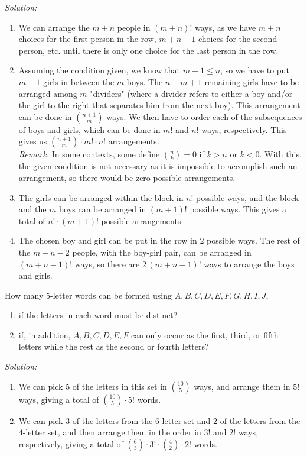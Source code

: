 \documentclass[12pt]{scrartcl}
\newenvironment{problem}[2][Problem]{\begin{trivlist}
\item[\hskip \labelsep {\bfseries #1}\hskip \labelsep {\bfseries #2.}]}{\end{trivlist}}
\newenvironment{sol}
    {\emph{Solution:}
    }
    {
    \qedhere
    }
\begin{document}
\begin{sol}
\begin{enumerate}[label=(\roman*)]
\item We can arrange the $m+n$ people in $\boxed{(m+n)!}$ ways, as we have $m+n$ choices for the first person in the row, $m+n-1$ choices for the second person, etc. until there is only one choice for the last person in the row. 
\item Assuming the condition given, we know that $m - 1 \leq n$, so we have to put $m-1$ girls in between the $m$ boys. The $n - m + 1$ remaining girls have to be arranged among $m$ "dividers" (where a divider refers to either a boy and/or the girl to the right that separates him from the next boy). This arrangement can be done in $\binom{n+1}{m}$ ways. We then have to order each of the subsequences of boys and girls, which can be done in $m!$ and $n!$ ways, respectively. This gives us $\boxed{\binom{n+1}{m} \cdot m! \cdot n!}$ arrangements. \\
\textit{Remark.} In some contexts, some define $\binom{n}{k} = 0$ if $k > n$ or $k < 0$. With this, the given condition is not necessary as it is impossible to accomplish such an arrangement, so there would be zero possible arrangements. 
\item The girls can be arranged within the block in $n!$ possible ways, and the block and the $m$ boys can be arranged in $(m+1)!$ possible ways. This gives a total of $\boxed{n! \cdot (m+1)!}$ possible arrangements.
\item The chosen boy and girl can be put in the row in $2$ possible ways. The rest of the $m + n - 2$ people, with the boy-girl pair, can be arranged in $(m+n-1)!$ ways, so there are $\boxed{2 \, (m+n-1)!}$ ways to arrange the boys and girls. 
\end{enumerate}
\end{sol}

\begin{problem}{4}
How many $5$-letter words can be formed using $A, B, C, D, E, F, G, H, I, J,$ 
\begin{enumerate}[label=(\roman*)]
\item if the letters in each word must be distinct? 
\item if, in addition, $A, B, C, D, E, F$ can only occur as the first, third, or fifth letters while the rest as the second or fourth letters? 
\end{enumerate}
\end{problem}

\begin{sol}
\begin{enumerate}[label=(\roman*)]
\item We can pick $5$ of the letters in this set in $\binom{10}{5}$ ways, and arrange them in $5!$ ways, giving a total of $\boxed{\binom{10}{5}\cdot 5!}$ words. 
\item We can pick $3$ of the letters from the $6$-letter set and $2$ of the letters from the $4$-letter set, and then arrange them in the order in $3!$ and $2!$ ways, respectively, giving a total of $\boxed{\binom{6}{3} \cdot 3! \cdot \binom{4}{2} \cdot 2!}$ words. 
\end{enumerate}
\end{sol}
\end{document}
